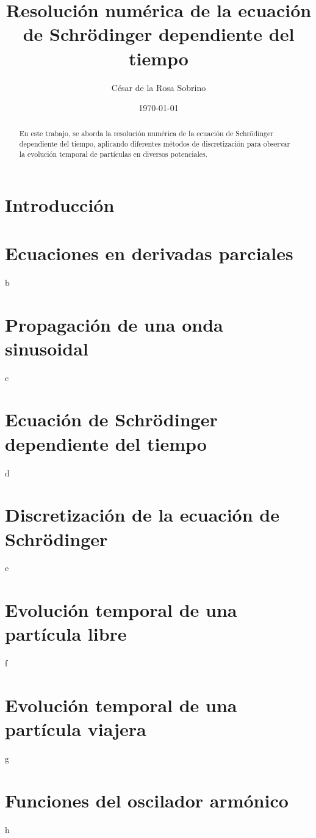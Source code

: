 \documentclass[twocolumn, aps, prd, 10pt, superscriptaddress, nofootinbib]{revtex4-2}
\begin{document}
\title{Resolución numérica de la ecuación de Schrödinger dependiente del tiempo}
\author{César de la Rosa Sobrino}
\date{\today}

\begin{abstract}
En este trabajo, se aborda la resolución numérica de la ecuación de Schrödinger dependiente del tiempo, aplicando diferentes métodos de discretización para observar la evolución temporal de partículas en diversos potenciales.
\end{abstract}

\maketitle

\section{Introducción}


\section{Ecuaciones en derivadas parciales}

b
\section{Propagación de una onda sinusoidal}

c
\section{Ecuación de Schrödinger dependiente del tiempo}

d
\section{Discretización de la ecuación de Schrödinger}

e
\section{Evolución temporal de una partícula libre}

f
\section{Evolución temporal de una partícula viajera}

g
\section{Funciones del oscilador armónico}

h
\end{document}
